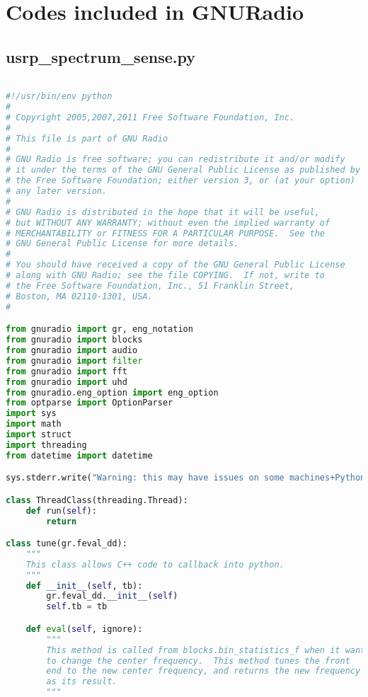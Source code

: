\chapter{Codes included in GNURadio}

\section{usrp\_spectrum\_sense.py}

\begin{lstlisting}[language=Python]

#!/usr/bin/env python
#
# Copyright 2005,2007,2011 Free Software Foundation, Inc.
#
# This file is part of GNU Radio
#
# GNU Radio is free software; you can redistribute it and/or modify
# it under the terms of the GNU General Public License as published by
# the Free Software Foundation; either version 3, or (at your option)
# any later version.
#
# GNU Radio is distributed in the hope that it will be useful,
# but WITHOUT ANY WARRANTY; without even the implied warranty of
# MERCHANTABILITY or FITNESS FOR A PARTICULAR PURPOSE.  See the
# GNU General Public License for more details.
#
# You should have received a copy of the GNU General Public License
# along with GNU Radio; see the file COPYING.  If not, write to
# the Free Software Foundation, Inc., 51 Franklin Street,
# Boston, MA 02110-1301, USA.
#

from gnuradio import gr, eng_notation
from gnuradio import blocks
from gnuradio import audio
from gnuradio import filter
from gnuradio import fft
from gnuradio import uhd
from gnuradio.eng_option import eng_option
from optparse import OptionParser
import sys
import math
import struct
import threading
from datetime import datetime

sys.stderr.write("Warning: this may have issues on some machines+Python version combinations to seg fault due to the callback in bin_statitics.\n\n")

class ThreadClass(threading.Thread):
    def run(self):
        return

class tune(gr.feval_dd):
    """
    This class allows C++ code to callback into python.
    """
    def __init__(self, tb):
        gr.feval_dd.__init__(self)
        self.tb = tb

    def eval(self, ignore):
        """
        This method is called from blocks.bin_statistics_f when it wants
        to change the center frequency.  This method tunes the front
        end to the new center frequency, and returns the new frequency
        as its result.
        """


\end{lstlisting}
